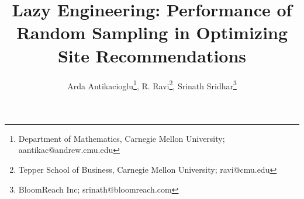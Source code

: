 \documentclass[11pt]{article}
\date{}
\begin{document}
\title{Lazy Engineering: Performance of Random Sampling in Optimizing
  Site Recommendations}
\author{Arda Antikacioglu\thanks{Department of Mathematics, Carnegie
    Mellon University; aantikac@andrew.cmu.edu},
R. Ravi\thanks{Tepper School of Business, Carnegie Mellon
    University; ravi@cmu.edu},
Srinath Sridhar\thanks{BloomReach Inc; srinath@bloomreach.com}}

\maketitle


%







{}

\end{document}
